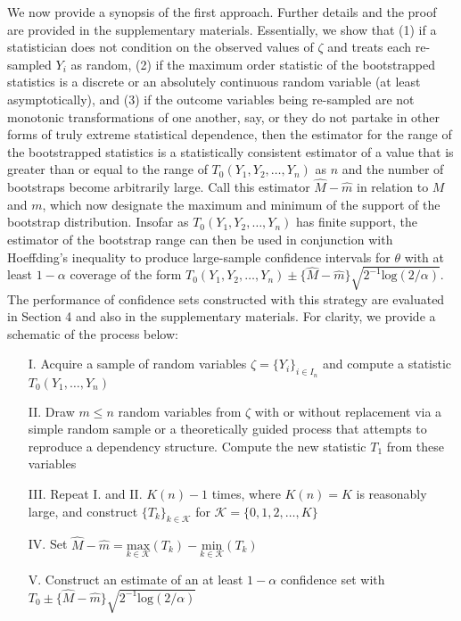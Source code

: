 \documentclass[12pt]{amsart}
\theoremstyle{plain}%
\theoremstyle{definition}
\theoremstyle{remark}
\numberwithin{equation}{section}
\begin{document}
We now provide a synopsis of the first approach. Further details and the proof are provided in the supplementary materials. Essentially, we show that (1) if a statistician does not condition on the observed values of $\zeta$ and treats each re-sampled $Y_i$ as random, (2) if the maximum order statistic of the bootstrapped statistics is a discrete or an absolutely continuous random variable (at least asymptotically), and (3) if the outcome variables being re-sampled are not monotonic transformations of one another, say, or they do not partake in other forms of truly extreme statistical dependence, then the estimator for the range of the bootstrapped statistics is a statistically consistent estimator of a value that is greater than or equal to the range of $T_0(Y_1, Y_2, \ldots, Y_n)$ as $n$ and the number of bootstraps become arbitrarily large. Call this estimator $\hat{M} - \hat{m}$ in relation to $M$ and $m$, which now designate the maximum and minimum of the support of the bootstrap distribution. Insofar as $T_0(Y_1, Y_2, \ldots, Y_n)$ has finite support, the estimator of the bootstrap range can then be used in conjunction with Hoeffding's inequality to produce large-sample confidence intervals for $\theta$ with at least $1-\alpha$ coverage of the form $T_0(Y_1, Y_2, \ldots, Y_n) \pm \{ \hat{M} - \hat{m}\} \sqrt{2^{-1} \text{log}(2/\alpha)}$. The performance of confidence sets constructed with this strategy are evaluated in Section 4 and also in the supplementary materials. For clarity, we provide a schematic of the process below:
\begin{enumerate}
\item[I.] Acquire a sample of random variables $\zeta = \{ Y_i \}_{i \in I_n}$ and compute a statistic $T_0(Y_1, \ldots, Y_n)$
\item[II.] Draw $m \leq n$ random variables from $\zeta$ with or without replacement via a simple random sample or a theoretically guided process that attempts to reproduce a dependency structure. Compute the new statistic $T_1$ from these variables
\item[III.] Repeat I. and II. $K(n) -1$ times, where $K(n)=K$ is reasonably large, and construct $\{ T_k \}_{k \in \mathcal{K}}$ for $\mathcal{K} = \{0, 1, 2, \ldots, K \}$
\item[IV.] Set $\hat{M} - \hat{m} = \underset{k \in \mathcal{K}}{\text{max}}(T_k) - \underset{k \in \mathcal{K}}{\text{min}}(T_k)$
\item[V.] Construct an estimate of an at least $1-\alpha$ confidence set with $T_0 \pm \{ \hat{M} - \hat{m} \} \sqrt{2^{-1} \text{log}(2/\alpha)}$
\end{enumerate}
\end{document}
